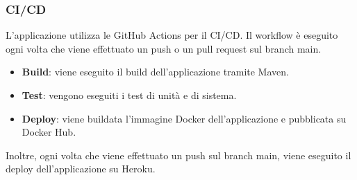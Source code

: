 \documentclass[8pt]{beamer}
\begin{document}
\begin{frame}
    \frametitle{CI/CD}
    L'applicazione utilizza le GitHub Actions per il CI/CD.
    Il workflow è eseguito ogni volta che viene effettuato un push o un pull request sul branch main.
    \begin{itemize}
        \item \textbf{Build}: viene eseguito il build dell'applicazione tramite Maven.
        \item \textbf{Test}: vengono eseguiti i test di unità e di sistema.
        \item \textbf{Deploy}: viene buildata l'immagine Docker dell'applicazione e pubblicata su Docker Hub.
    \end{itemize}
    Inoltre, ogni volta che viene effettuato un push sul branch main, viene eseguito il deploy dell'applicazione su Heroku.
\end{frame}
\end{document}
